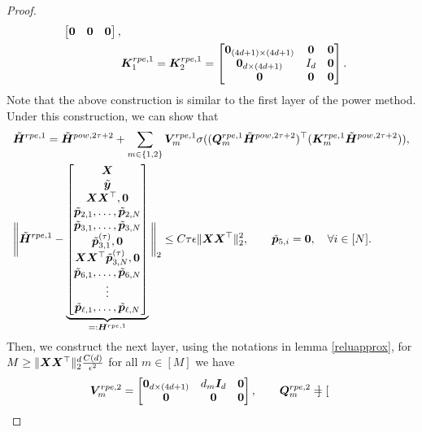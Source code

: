 \begin{proof}
\begin{align*}
\begin{bmatrix}
            \boldsymbol{0}&\boldsymbol{0}&\boldsymbol{0}
        \end{bmatrix},\\
        &\boldsymbol{K}_1^{rpe,1}=\boldsymbol{K}_2^{rpe,1} = \begin{bmatrix}
            \boldsymbol{0}_{(4d+1)\times(4d+1)}&\boldsymbol{0}&\boldsymbol{0}\\
            \boldsymbol{0}_{d\times(4d+1)}& I_d&\boldsymbol{0}\\
            \boldsymbol{0}&\boldsymbol{0}&\boldsymbol{0}
        \end{bmatrix}.
    \end{align*}
    Note that the above construction is similar to the first layer of the power method. Under this construction, we can show that
    \begin{align}\label{diffhrpe1}
        &\tilde{\boldsymbol{H}}^{rpe,1}=\tilde{\boldsymbol{H}}^{pow,2\tau+2}+\sum_{m\in\{1,2\}}\boldsymbol{V}_m^{rpe,1}\sigma((\boldsymbol{Q}_m^{rpe,1}\tilde{\boldsymbol{H}}^{pow,2\tau+2})^\top(\boldsymbol{K}_m^{rpe,1}\tilde{\boldsymbol{H}}^{pow,2\tau+2})),\nonumber\\
        &\Bigg\Vert\tilde{\boldsymbol{H}}^{rpe,1}-\underbrace{\begin{bmatrix}
            \boldsymbol{X}\\
            \tilde{\boldsymbol{y}}\\
            \boldsymbol{X}\boldsymbol{X}^\top,\boldsymbol{0}\\
            \tilde{\boldsymbol{p}}_{2,1},\ldots,\tilde{\boldsymbol{p}}_{2,N}\\
            \tilde{\boldsymbol{p}}_{3,1},\ldots,\tilde{\boldsymbol{p}}_{3,N}\\
            \tilde{\boldsymbol{p}}_{3,1}^{(\tau)},\boldsymbol{0}\\
            \boldsymbol{X}\boldsymbol{X}^\top\tilde{\boldsymbol{p}}_{3,N}^{(\tau)},\boldsymbol{0}\\
            \tilde{\boldsymbol{p}}_{6,1},\ldots,\tilde{\boldsymbol{p}}_{6,N}\\
            \vdots\\
            \tilde{\boldsymbol{p}}_{\ell,1},\ldots,\tilde{\boldsymbol{p}}_{\ell,N}
        \end{bmatrix}}_{=:\boldsymbol{H}^{rpe,1}}\Bigg\Vert_2\leq C\tau\epsilon\Vert\boldsymbol{X}\boldsymbol{X}^\top\Vert_2^2,\qquad\tilde{\boldsymbol{p}}_{5,i}=\boldsymbol{0},\quad\forall i\in[N].
    \end{align}
    Then, we construct the next layer, using the notations in lemma \ref{reluapprox}, for $M\geq \Vert\boldsymbol{X}\boldsymbol{X}^\top\Vert_2^d\frac{C(d)}{\epsilon^2}$ for all $m\in[M]$ we have 
    \begin{align*}
       &\boldsymbol{V}_m^{rpe,2}=\begin{bmatrix}
            \boldsymbol{0}_{d\times(4d+1)}&d_m\boldsymbol{I}_d&\boldsymbol{0}\\
            \boldsymbol{0}&\boldsymbol{0}&\boldsymbol{0}
       \end{bmatrix},\qquad \boldsymbol{Q}_m^{rpe,2} =\begin{bmatrix}

\end{bmatrix}
\end{align*}
\end{proof}

